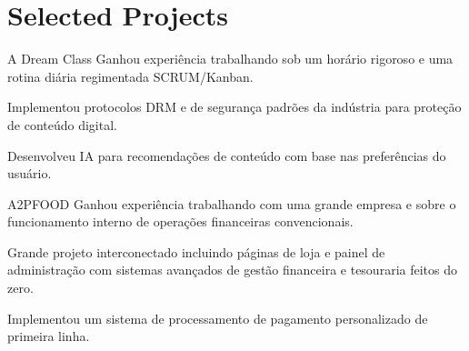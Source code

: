 \section{Selected Projects}

\begin{experience}{A Dream Class}{
}
Ganhou experiência trabalhando sob um horário rigoroso e uma rotina diária regimentada SCRUM/Kanban.

\begin{contribs}
	\item{Implementou protocolos DRM e de segurança padrões da indústria para proteção de conteúdo digital.}
	\item{Desenvolveu IA para recomendações de conteúdo com base nas preferências do usuário.}
\end{contribs}
\end{experience}

\begin{experience}{A2PFOOD}{
}
Ganhou experiência trabalhando com uma grande empresa e sobre o funcionamento interno de operações financeiras convencionais.

\begin{contribs}
	\item{Grande projeto interconectado incluindo páginas de loja e painel de administração com sistemas avançados de gestão financeira e tesouraria feitos do zero.}
	\item{Implementou um sistema de processamento de pagamento personalizado de primeira linha.}
\end{contribs}
\end{experience}
